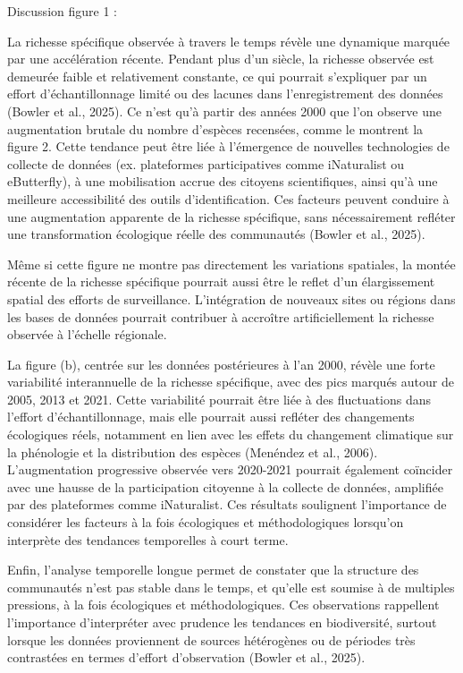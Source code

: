 \documentclass[9pt,twocolumn,twoside,]{pnas-new}
\begin{document}
Discussion figure 1 :

La richesse spécifique observée à travers le temps révèle une dynamique
marquée par une accélération récente. Pendant plus d'un siècle, la
richesse observée est demeurée faible et relativement constante, ce qui
pourrait s'expliquer par un effort d'échantillonnage limité ou des
lacunes dans l'enregistrement des données (Bowler et al., 2025). Ce
n'est qu'à partir des années 2000 que l'on observe une augmentation
brutale du nombre d'espèces recensées, comme le montrent la figure 2.
Cette tendance peut être liée à l'émergence de nouvelles technologies de
collecte de données (ex. plateformes participatives comme iNaturalist ou
eButterfly), à une mobilisation accrue des citoyens scientifiques, ainsi
qu'à une meilleure accessibilité des outils d'identification. Ces
facteurs peuvent conduire à une augmentation apparente de la richesse
spécifique, sans nécessairement refléter une transformation écologique
réelle des communautés (Bowler et al., 2025).

Même si cette figure ne montre pas directement les variations spatiales,
la montée récente de la richesse spécifique pourrait aussi être le
reflet d'un élargissement spatial des efforts de surveillance.
L'intégration de nouveaux sites ou régions dans les bases de données
pourrait contribuer à accroître artificiellement la richesse observée à
l'échelle régionale.

La figure (b), centrée sur les données postérieures à l'an 2000, révèle
une forte variabilité interannuelle de la richesse spécifique, avec des
pics marqués autour de 2005, 2013 et 2021. Cette variabilité pourrait
être liée à des fluctuations dans l'effort d'échantillonnage, mais elle
pourrait aussi refléter des changements écologiques réels, notamment en
lien avec les effets du changement climatique sur la phénologie et la
distribution des espèces (Menéndez et al., 2006). L'augmentation
progressive observée vers 2020-2021 pourrait également coïncider avec
une hausse de la participation citoyenne à la collecte de données,
amplifiée par des plateformes comme iNaturalist. Ces résultats
soulignent l'importance de considérer les facteurs à la fois écologiques
et méthodologiques lorsqu'on interprète des tendances temporelles à
court terme.

Enfin, l'analyse temporelle longue permet de constater que la structure
des communautés n'est pas stable dans le temps, et qu'elle est soumise à
de multiples pressions, à la fois écologiques et méthodologiques. Ces
observations rappellent l'importance d'interpréter avec prudence les
tendances en biodiversité, surtout lorsque les données proviennent de
sources hétérogènes ou de périodes très contrastées en termes d'effort
d'observation (Bowler et al., 2025).
\end{document}
